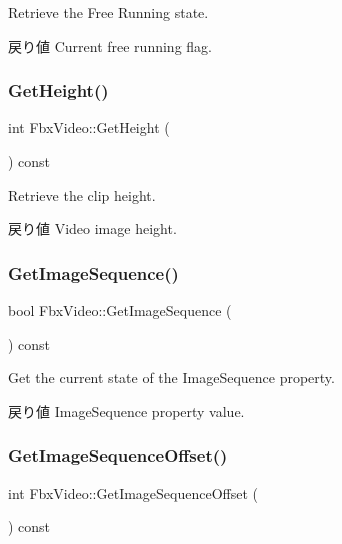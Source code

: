 Retrieve the Free Running state. \begin{DoxyReturn}{戻り値}
Current free running flag. 
\end{DoxyReturn}
\mbox{\label{class_fbx_video_a49e54923c0ec892e5bebf479545a32de}} 
\subsubsection{\texorpdfstring{Get\+Height()}{GetHeight()}}
{\footnotesize\ttfamily int Fbx\+Video\+::\+Get\+Height (\begin{DoxyParamCaption}{ }\end{DoxyParamCaption}) const}

Retrieve the clip height. \begin{DoxyReturn}{戻り値}
Video image height. 
\end{DoxyReturn}
\mbox{\label{class_fbx_video_aefb54b6ccb813ae4da9062b27db5fb1f}} 
\subsubsection{\texorpdfstring{Get\+Image\+Sequence()}{GetImageSequence()}}
{\footnotesize\ttfamily bool Fbx\+Video\+::\+Get\+Image\+Sequence (\begin{DoxyParamCaption}{ }\end{DoxyParamCaption}) const}

Get the current state of the Image\+Sequence property. \begin{DoxyReturn}{戻り値}
Image\+Sequence property value. 
\end{DoxyReturn}
\mbox{\label{class_fbx_video_a9b37e1a2972b4cf0016ad94d86ea5680}} 
\subsubsection{\texorpdfstring{Get\+Image\+Sequence\+Offset()}{GetImageSequenceOffset()}}
{\footnotesize\ttfamily int Fbx\+Video\+::\+Get\+Image\+Sequence\+Offset (\begin{DoxyParamCaption}{ }\end{DoxyParamCaption}) const}

